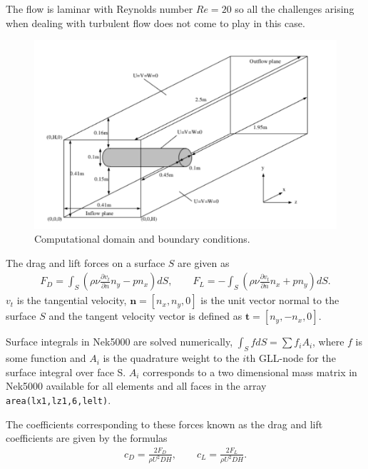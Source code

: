 The flow is laminar with Reynolds number $Re=20$ so all the 
challenges arising when dealing with turbulent flow does not come to play in this case. 
%
\begin{figure}[h]
    \centering
    \includegraphics[width = 1.0\textwidth]{Figures/cylinder.pdf}
    \caption{Computational domain and boundary conditions.}
    \label{fig:cylinder}
\end{figure}
%
The drag and lift forces on a surface $S$ are given as 
%
\begin{align}
    F_D = \int_{S}(\rho \nu \frac{\partial v_t}{\partial n}n_y-pn_x)dS, \qquad
    F_L = -\int_{S}(\rho \nu \frac{\partial v_t}{\partial n}n_x+pn_y)dS.
    \label{eq:dragnlift}
\end{align}
%
$v_t$ is the tangential velocity, $\mathbf{n}=[n_x,n_y,0]$ is the unit vector normal to the surface $S$ 
and the tangent velocity vector is defined as $\mathbf{t} = [n_y,-n_x,0]$.
 
Surface integrals in Nek5000 are solved numerically, $\int_S f dS = \sum f_i A_i$, where $f$ is some function and 
$A_i$ is the quadrature weight to the $i$th GLL-node for the surface integral over face S.
$A_i$ corresponds to a two dimensional mass matrix in Nek5000 available for all elements and all faces in the array 
\verb|area(lx1,lz1,6,lelt)|.

The coefficients corresponding to these forces known as the drag and lift coefficients 
are given by the formulas 
\begin{align}
    c_D = \frac{2F_D}{\rho U^2 D H}, \qquad
    c_L = \frac{2F_L}{\rho U^2 D H}.
    \label{eq:dragnliftcoeffs}
\end{align}


